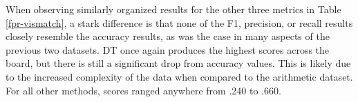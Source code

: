 \documentclass[12pt]{uthesis-v12}  %
\begin{document}
When observing similarly organized results for the other three metrics in Table \ref{fpr-vismatch}, a stark difference is that none of the F1, precision, or recall results closely resemble the accuracy results, as was the case in many aspects of the previous two datasets. DT once again produces the highest scores across the board, but there is still a significant drop from accuracy values. This is likely due to the increased complexity of the data when compared to the arithmetic dataset. For all other methods, scores ranged anywhere from .240 to .660.

\begin{figure}\centering
{}
	\hfill	
{}
		

\end{figure}
\end{document}
